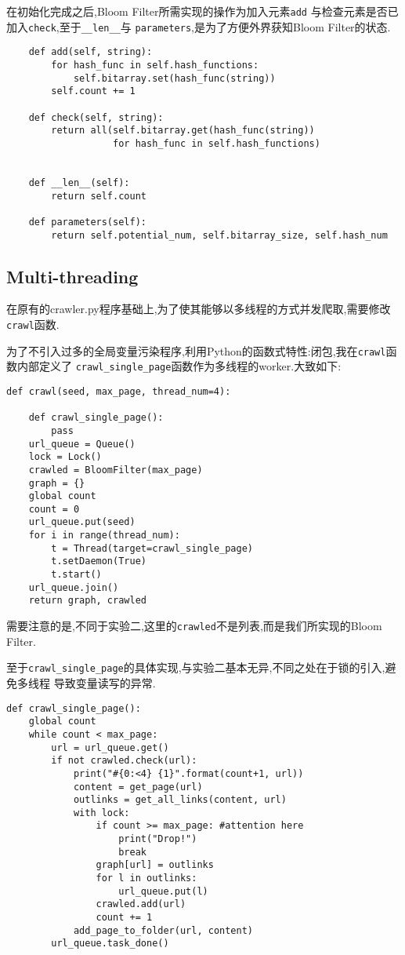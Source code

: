 \documentclass[a4paper]{article}
\begin{document}
在初始化完成之后,Bloom Filter所需实现的操作为加入元素\texttt{add}
与检查元素是否已加入\texttt{check},至于\texttt{__len__}与
\texttt{parameters},是为了方便外界获知Bloom Filter的状态.
\begin{verbatim}
    def add(self, string):
        for hash_func in self.hash_functions:
            self.bitarray.set(hash_func(string))
        self.count += 1

    def check(self, string):
        return all(self.bitarray.get(hash_func(string))
                   for hash_func in self.hash_functions)


    def __len__(self):
        return self.count

    def parameters(self):
        return self.potential_num, self.bitarray_size, self.hash_num
\end{verbatim}
        \subsection{Multi-threading}
在原有的crawler.py程序基础上,为了使其能够以多线程的方式并发爬取,需要修改\texttt{crawl}函数.

为了不引入过多的全局变量污染程序,利用Python的函数式特性:闭包,我在\texttt{crawl}函数内部定义了
\texttt{crawl_single_page}函数作为多线程的worker.大致如下:
\begin{verbatim}
def crawl(seed, max_page, thread_num=4):

    def crawl_single_page():
        pass
    url_queue = Queue()
    lock = Lock()
    crawled = BloomFilter(max_page)
    graph = {}
    global count
    count = 0
    url_queue.put(seed)
    for i in range(thread_num):
        t = Thread(target=crawl_single_page)
        t.setDaemon(True)
        t.start()
    url_queue.join()
    return graph, crawled
\end{verbatim}

需要注意的是,不同于实验二,这里的\texttt{crawled}不是列表,而是我们所实现的Bloom Filter.

至于\texttt{crawl_single_page}的具体实现,与实验二基本无异,不同之处在于锁的引入,避免多线程
导致变量读写的异常.
\begin{verbatim}
def crawl_single_page():
    global count
    while count < max_page:
        url = url_queue.get()
        if not crawled.check(url):
            print("#{0:<4} {1}".format(count+1, url))
            content = get_page(url)
            outlinks = get_all_links(content, url)
            with lock:
                if count >= max_page: #attention here
                    print("Drop!")
                    break
                graph[url] = outlinks
                for l in outlinks:
                    url_queue.put(l)
                crawled.add(url)
                count += 1
            add_page_to_folder(url, content)
        url_queue.task_done()
\end{verbatim}
\end{document}
